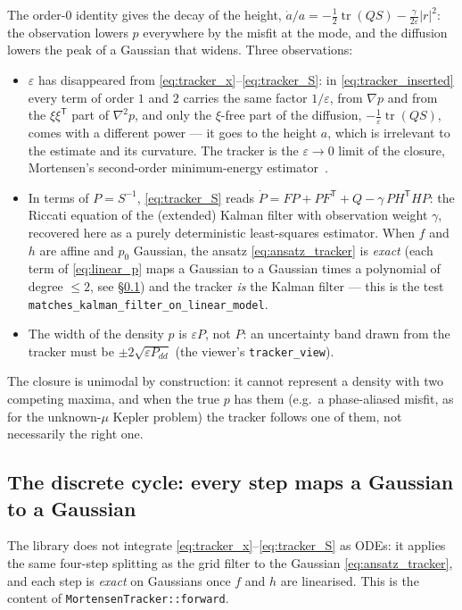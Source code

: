\documentclass[11pt,a4paper]{article}
\newcommand{\tr}{\operatorname{tr}}
\newcommand{\T}{^{\mathsf T}}
\newcommand{\eps}{\varepsilon}
\newcommand{\abs}[1]{\left\lvert #1 \right\rvert}
\newcommand{\grad}{\nabla}
\theoremstyle{plain}
\theoremstyle{definition}
\theoremstyle{remark}
\begin{document}
The order-0 identity gives the decay of the height, $\dot a/a = -\tfrac12\tr(QS) - \tfrac{\gamma}{2\eps}\abs r^2$: the observation lowers $p$ everywhere by the misfit at the mode, and the diffusion lowers the peak of a Gaussian that widens. Three observations:
\begin{itemize}[nosep]
  \item $\eps$ has disappeared from \eqref{eq:tracker_x}--\eqref{eq:tracker_S}: in \eqref{eq:tracker_inserted} every term of order $1$ and $2$ carries the same factor $1/\eps$, from $\grad p$ and from the $\xi\xi\T$ part of $\grad^2p$, and only the $\xi$-free part of the diffusion, $-\tfrac1\eps\tr(QS)$, comes with a different power --- it goes to the height $a$, which is irrelevant to the estimate and its curvature. The tracker is the $\eps\to0$ limit of the closure, Mortensen's second-order minimum-energy estimator~\cite{Mortensen1968}.
  \item In terms of $P=S^{-1}$, \eqref{eq:tracker_S} reads $\dot P = FP + PF\T + Q - \gamma\,PH\T HP$: the Riccati equation of the (extended) Kalman filter with observation weight $\gamma$, recovered here as a purely deterministic least-squares estimator. When $f$ and $h$ are affine and $p_0$ Gaussian, the ansatz \eqref{eq:ansatz_tracker} is \emph{exact} (each term of \eqref{eq:linear_p} maps a Gaussian to a Gaussian times a polynomial of degree $\le2$, see \S\ref{sec:tracker_cycle}) and the tracker \emph{is} the Kalman filter --- this is the test \texttt{matches\_kalman\_filter\_on\_linear\_model}.
  \item The width of the density $p$ is $\eps P$, not $P$: an uncertainty band drawn from the tracker must be $\pm2\sqrt{\eps P_{dd}}$ (the viewer's \texttt{tracker\_view}).
\end{itemize}
The closure is unimodal by construction: it cannot represent a density with two competing maxima, and when the true $p$ has them (e.g.\ a phase-aliased misfit, as for the unknown-$\mu$ Kepler problem) the tracker follows one of them, not necessarily the right one.

\subsection{The discrete cycle: every step maps a Gaussian to a Gaussian}
\label{sec:tracker_cycle}

The library does not integrate \eqref{eq:tracker_x}--\eqref{eq:tracker_S} as ODEs: it applies the same four-step splitting as the grid filter to the Gaussian \eqref{eq:ansatz_tracker}, and each step is \emph{exact} on Gaussians once $f$ and $h$ are linearised. This is the content of \texttt{MortensenTracker::forward}.
\end{document}
